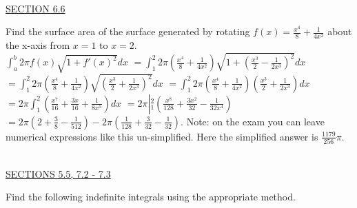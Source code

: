 \documentclass{exam}
\begin{document}
\begin{questions}
\ \\
\underline{SECTION 6.6} 

\question Find the surface area of the surface generated by rotating $f(x) = \frac{x^4}{8} + \frac{1}{4x^2}$ about the x-axis from $x=1$ to $x=2$.
\\ {\color{red} $\displaystyle\int_a^b 2\pi f(x)\sqrt{1+f'(x)^2}dx $ $  = \displaystyle\int_1^2 2\pi \left(  \frac{x^4}{8} + \frac{1}{4x^2} \right) \sqrt{ 1 + \left( \frac{x^3}{2} - \frac{1}{2x^3}\right)^2}dx$ $  = \displaystyle\int_1^2 2\pi \left(  \frac{x^4}{8} + \frac{1}{4x^2} \right) \sqrt{ \left( \frac{x^3}{2} + \frac{1}{2x^3}\right)^2}dx$ $  = \displaystyle\int_1^2 2\pi \left(  \frac{x^4}{8} + \frac{1}{4x^2} \right) \left( \frac{x^3}{2} + \frac{1}{2x^3}\right)dx$ $ = 2\pi \displaystyle\int_1^2 \left( \frac{x^7}{16} + \frac{3x}{16} + \frac{1}{8x^5} \right)  dx$ $ = 2\pi \left|_1^2 \left( \frac{x^8}{128} + \frac{3x^2}{32} - \frac{1}{32x^4} \right) \right.$ $ = 2\pi \left(2 + \frac{3}{8} - \frac{1}{512 }\right) - 2\pi\left( \frac{1}{128} + \frac{3}{32} - \frac{1}{32}\right)$.  Note: on the exam you can leave numerical expressions like this un-simplified.  Here the simplified answer is $\frac{1179}{256}\pi$. }

    \newpage\thispagestyle{empty}

\ \\
\underline{SECTIONS 5.5, 7.2 - 7.3 }
\thispagestyle{empty}

\question Find the following indefinite integrals using the appropriate method.  
\begin{parts}
\end{parts}
\end{questions}
\end{document}
